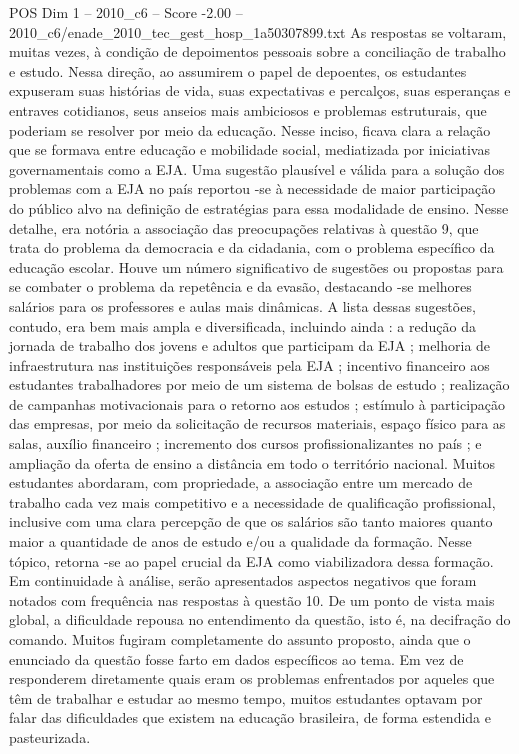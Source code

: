 \begin{textsample}{POS Dim 1 – 2010\_c6 – Score -2.00 – 2010\_c6/enade\_2010\_tec\_gest\_hosp\_1a50307899.txt}
As respostas se voltaram, muitas vezes, à condição de depoimentos pessoais sobre a conciliação de trabalho e estudo.
Nessa direção, ao assumirem o papel de depoentes, os estudantes expuseram suas histórias de vida, suas expectativas e percalços, suas esperanças e entraves cotidianos, seus anseios mais ambiciosos e problemas estruturais, que poderiam se resolver por meio da educação.
Nesse inciso, ficava clara a relação que se formava entre educação e mobilidade social, mediatizada por iniciativas governamentais como a EJA.
Uma sugestão plausível e válida para a solução dos problemas com a EJA no país reportou -se à necessidade de maior participação do público alvo na definição de estratégias para essa modalidade de ensino.
Nesse detalhe, era notória a associação das preocupações relativas à questão 9, que trata do problema da democracia e da cidadania, com o problema específico da educação escolar.
Houve um número significativo de sugestões ou propostas para se combater o problema da repetência e da evasão, destacando -se melhores salários para os professores e aulas mais dinâmicas.
A lista dessas sugestões, contudo, era bem mais ampla e diversificada, incluindo ainda : a redução da jornada de trabalho dos jovens e adultos que participam da EJA ; melhoria de infraestrutura nas instituições responsáveis pela EJA ; incentivo financeiro aos estudantes trabalhadores por meio de um sistema de bolsas de estudo ; realização de campanhas motivacionais para o retorno aos estudos ; estímulo à participação das empresas, por meio da solicitação de recursos materiais, espaço físico para as salas, auxílio financeiro ; incremento dos cursos profissionalizantes no país ; e ampliação da oferta de ensino a distância em todo o território nacional.
Muitos estudantes abordaram, com propriedade, a associação entre um mercado de trabalho cada vez mais competitivo e a necessidade de qualificação profissional, inclusive com uma clara percepção de que os salários são tanto maiores quanto maior a quantidade de anos de estudo e/ou a qualidade da formação.
Nesse tópico, retorna -se ao papel crucial da EJA como viabilizadora dessa formação.
Em continuidade à análise, serão apresentados aspectos negativos que foram notados com frequência nas respostas à questão 10.
De um ponto de vista mais global, a dificuldade repousa no entendimento da questão, isto é, na decifração do comando.
Muitos fugiram completamente do assunto proposto, ainda que o enunciado da questão fosse farto em dados específicos ao tema.
Em vez de responderem diretamente quais eram os problemas enfrentados por aqueles que têm de trabalhar e estudar ao mesmo tempo, muitos estudantes optavam por falar das dificuldades que existem na educação brasileira, de forma estendida e pasteurizada.

\end{textsample}

